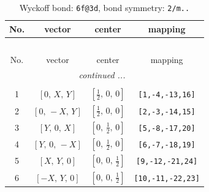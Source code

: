 \documentclass[fleqn,8pt]{jsarticle}
\begin{document}
\begin{longtable}{cccc}
\caption{Wyckoff bond: {\tt 6f@3d}, bond symmetry: {\tt 2/m..}}
 \\
 \hline \hline
No. & vector & center & mapping \\ \hline \endfirsthead

\multicolumn{3}{l}{\tablename\ \thetable{}} \\
 \hline \hline
No. & vector & center & mapping \\ \hline \endhead

 \hline \hline
\multicolumn{3}{r}{\footnotesize\it continued ...} \\ \endfoot

 \hline \hline
\multicolumn{3}{r}{} \\ \endlastfoot

1 & $\left[ 0,\, X,\, Y \right]$ & $\left[ \frac{1}{2},\, 0,\, 0 \right]$ & {\tt [1,-4,-13,16]} \\ \hline
2 & $\left[ 0,\, - X,\, Y \right]$ & $\left[ \frac{1}{2},\, 0,\, 0 \right]$ & {\tt [2,-3,-14,15]} \\ \hline
3 & $\left[ Y,\, 0,\, X \right]$ & $\left[ 0,\, \frac{1}{2},\, 0 \right]$ & {\tt [5,-8,-17,20]} \\ \hline
4 & $\left[ Y,\, 0,\, - X \right]$ & $\left[ 0,\, \frac{1}{2},\, 0 \right]$ & {\tt [6,-7,-18,19]} \\ \hline
5 & $\left[ X,\, Y,\, 0 \right]$ & $\left[ 0,\, 0,\, \frac{1}{2} \right]$ & {\tt [9,-12,-21,24]} \\ \hline
6 & $\left[ - X,\, Y,\, 0 \right]$ & $\left[ 0,\, 0,\, \frac{1}{2} \right]$ & {\tt [10,-11,-22,23]} \\
\end{longtable}
\renewcommand{\arraystretch}{1.2}
\end{document}
